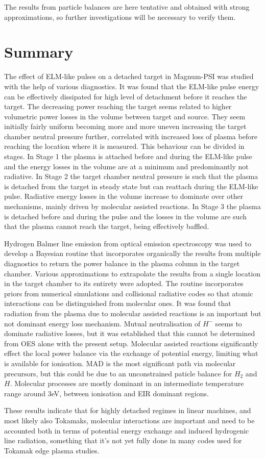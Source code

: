 The results from particle balances are here tentative and obtained with strong approximations, so further investigations will be necessary to verify them.


\section{Summary}\label{summary magnum-psi}

The effect of ELM-like pulses on a detached target in Magnum-PSI was studied with the help of various diagnostics. It was found that the ELM-like pulse energy can be effectively dissipated for high level of detachment before it reaches the target. The decreasing power reaching the target seems related to higher volumetric power losses in the volume between target and source. They seem initially fairly uniform becoming more and more uneven increasing the target chamber neutral pressure further, correlated with increased loss of plasma before reaching the location where it is measured. This behaviour can be divided in stages. In Stage 1 the plasma is attached before and during the ELM-like pulse and the energy losses in the volume are at a minimum and predominantly not radiative. In Stage 2 the target chamber neutral pressure is such that the plasma is detached from the target in steady state but can reattach during the ELM-like pulse. Radiative energy losses in the volume increase to dominate over other mechanisms, mainly driven by molecular assisted reactions. In Stage 3 the plasma is detached before and during the pulse and the losses in the volume are such that the plasma cannot reach the target, being effectively baffled.

Hydrogen Balmer line emission from optical emission spectroscopy was used to develop a Bayesian routine that incorporates organically the results from multiple diagnostics to return the power balance in the plasma column in the target chamber. Various approximations to extrapolate the results from a single location in the target chamber to its entirety were adopted. The routine incorporates priors from numerical simulations and collisional radiative codes so that atomic interactions can be distinguished from molecular ones. It was found that radiation from the plasma due to molecular assisted reactions is an important but not dominant energy loss mechanism. Mutual neutralisation of ${H}^-$ seems to dominate radiative losses, but it was established that this cannot be determined from OES alone with the present setup. Molecular assisted reactions significantly effect the local power balance via the exchange of potential energy, limiting what is available for ionisation. MAD is the most significant path via molecular precursors, but this could be due to an unconstrained paticle balance for $H_2$ and $H$. Molecular processes are mostly dominant in an intermediate temperature range around 3eV, between ionisation and EIR dominant regions.

These results indicate that for highly detached regimes in linear machines, and most likely also Tokamaks, molecular interactions are important and need to be accounted both in terms of potential energy exchange and induced hydrogenic line radiation, something that it’s not yet fully done in many codes used for Tokamak edge plasma studies.
